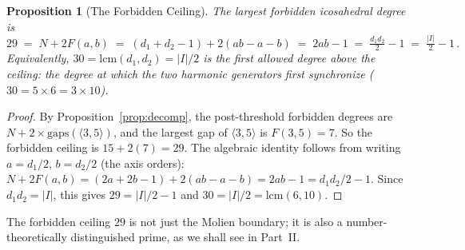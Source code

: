 \documentclass[11pt,letterpaper]{article}
\newtheorem{proposition}[theorem]{Proposition}
\theoremstyle{definition}
\newcommand{\abs}[1]{\lvert #1 \rvert}
\newcommand{\gen}[1]{\langle #1 \rangle}
\begin{document}
\begin{proposition}[The Forbidden Ceiling]\label{prop:ceiling}
The largest forbidden icosahedral degree is
\begin{equation}\label{eq:ceiling}
  29 \;=\; N + 2F(a,b) \;=\; (d_1{+}d_2{-}1) + 2(ab{-}a{-}b) \;=\; 2ab-1 \;=\; \tfrac{d_1 d_2}{2}-1 \;=\; \tfrac{\abs{I}}{2}-1\,.
\end{equation}
Equivalently, $30 = \mathrm{lcm}(d_1,d_2)=\abs{I}/2$ is the first allowed degree above the ceiling: the degree at which the two harmonic generators first synchronize ($30=5\times6=3\times10$).
\end{proposition}
\begin{proof}
By Proposition~\ref{prop:decomp}, the post-threshold forbidden degrees are $N+2\times\mathrm{gaps}(\gen{3,5})$, and the largest gap of $\gen{3,5}$ is $F(3,5)=7$.  So the forbidden ceiling is $15+2(7)=29$.  The algebraic identity follows from writing $a=d_1/2$, $b=d_2/2$ (the axis orders): $N+2F(a,b) = (2a+2b-1)+2(ab-a-b) = 2ab-1 = d_1 d_2/2-1$.  Since $d_1 d_2=\abs{I}$, this gives $29=\abs{I}/2-1$ and $30=\abs{I}/2=\mathrm{lcm}(6,10)$.
\end{proof}
The forbidden ceiling $29$ is not just the Molien boundary; it is also a number-theoretically distinguished prime, as we shall see in Part~II.
\end{document}
